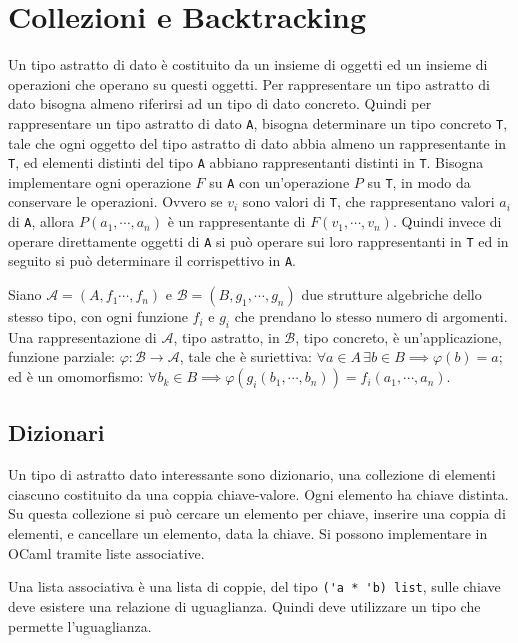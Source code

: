 \documentclass{article}
\numberwithin{equation}{subsection}
\begin{document}
\section{Collezioni e Backtracking}


Un tipo astratto di dato è costituito da un insieme di oggetti ed un insieme di operazioni che operano su questi oggetti. 
Per rappresentare un tipo astratto di dato bisogna almeno riferirsi ad un tipo di dato concreto. Quindi per rappresentare un tipo astratto di dato \verb|A|, bisogna determinare un tipo concreto \verb|T|, tale che ogni oggetto del tipo astratto di dato abbia almeno un rappresentante in \verb|T|, ed elementi distinti del tipo \verb|A| abbiano rappresentanti distinti in \verb|T|. 
Bisogna implementare ogni operazione $F$ su \verb|A| con un'operazione $P$ su \verb|T|, in modo da conservare le operazioni. Ovvero se $v_i$ sono valori di \verb|T|, che rappresentano valori $a_i$ di \verb|A|, allora $P(a_1,\cdots,a_n)$ è un rappresentante di $F(v_1,\cdots,v_n)$. 
Quindi invece di operare direttamente oggetti di \verb|A| si può operare sui loro rappresentanti in \verb|T| ed in seguito si può determinare il corrispettivo in \verb|A|. 

Siano $\mathscr{A}=(A,f_1\cdots,f_n)$ e $\mathscr{B}=(B,g_1,\cdots,g_n)$ due strutture algebriche dello stesso tipo, con ogni funzione $f_i$ e $g_i$ che prendano lo stesso numero di argomenti. Una rappresentazione di $\mathscr{A}$, tipo astratto, in $\mathscr{B}$, tipo concreto, è un'applicazione, funzione parziale: $\varphi:\mathscr{B}\to\mathscr{A}$, tale che è suriettiva: $\forall a\in A \,\exists b\in B\implies \varphi(b)=a$; ed è un omomorfismo: $\forall b_k\in B\implies\varphi(g_i(b_1,\cdots,b_n))=f_i(a_1,\cdots,a_n)$. 

\subsection{Dizionari}

Un tipo di astratto dato interessante sono dizionario, una collezione di elementi ciascuno costituito da una coppia chiave-valore. Ogni elemento ha chiave distinta. 
Su questa collezione si può cercare un elemento per chiave, inserire una coppia di elementi, e cancellare un elemento, data la chiave. Si possono implementare in OCaml tramite liste associative. 

Una lista associativa è una lista di coppie, del tipo \verb|('a * 'b) list|, sulle chiave deve esistere una relazione di uguaglianza. Quindi deve utilizzare un tipo che permette l'uguaglianza. 
\end{document}

